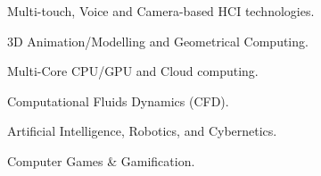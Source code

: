 

\begin{cventries}


  \cventry
    {} 
    {}
    {}
    {}
    {    	
	  \vspace{-1.7cm}
      \begin{multicols}{2}
      \begin{cvitems}
        \item {Multi-touch, Voice and Camera-based HCI technologies.}
        \item {3D Animation/Modelling and Geometrical Computing.}
        \item {Multi-Core CPU/GPU and Cloud computing.}
        \item {Computational Fluids Dynamics (CFD).}
        \item {Artificial Intelligence, Robotics, and Cybernetics.}
        \item {Computer Games \& Gamification.}
      \end{cvitems}
	  \end{multicols}
	  \vspace{-0.5cm}
    }

\end{cventries}
